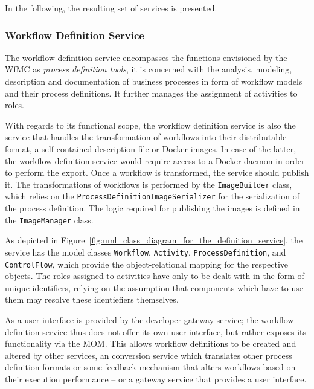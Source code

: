   In the following, the resulting set of services is presented.

  \subsubsection{Workflow Definition Service} %
    \label{subs:workflow_definition_service}

    The workflow definition service encompasses the functions envisioned by the \ac{WfMC} as \emph{process definition tools}, \ie it is concerned with the analysis, modeling, description and documentation of business processes in form of workflow models and their process definitions. It further manages the assignment of activities to roles.

    With regards to its functional scope, the workflow definition service is also the service that handles the transformation of workflows into their distributable format, \eg a self-contained description file or Docker images. In case of the latter, the workflow definition service would require access to a Docker daemon in order to perform the export. Once a workflow is transformed, the service should publish it. The transformations of workflows is performed by the \texttt{ImageBuilder} class, which relies on the \texttt{ProcessDefinitionImageSerializer} for the serialization of the process definition. The logic required for publishing the images is defined in the \texttt{ImageManager} class.


    As depicted in Figure~\ref{fig:uml_class_diagram_for_the_definition_service},
    the service has the model classes \texttt{Workflow}, \texttt{Activity}, \texttt{ProcessDefinition}, and \texttt{ControlFlow}, which provide the object-relational mapping for the respective objects. The roles assigned to activities have only to be dealt with in the form of unique identifiers, relying on the assumption that components which have to use them may resolve these identiefiers themselves.

    As a user interface is provided by the developer gateway service; the workflow definition service thus does not offer its own user interface, but rather exposes its functionality via the \ac{MOM}. This allows workflow definitions to be created and altered by other services, \eg an conversion service which translates other process definition formats or some feedback mechanism that alters workflows based on their execution performance -- or a gateway service that provides a user interface.

